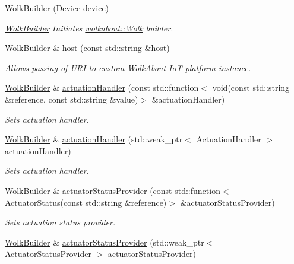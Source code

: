 \begin{DoxyCompactItemize}
\item 
\hyperlink{classwolkabout_1_1WolkBuilder_a4bd7227f1e389a34e18cc77030dd7d84}{Wolk\+Builder} (Device device)
\begin{DoxyCompactList}\small\item\em \hyperlink{classwolkabout_1_1WolkBuilder}{Wolk\+Builder} Initiates \hyperlink{classwolkabout_1_1Wolk}{wolkabout\+::\+Wolk} builder. \end{DoxyCompactList}\item 
\hyperlink{classwolkabout_1_1WolkBuilder}{Wolk\+Builder} \& \hyperlink{classwolkabout_1_1WolkBuilder_a208c0a0d397efd615863ec1ea4f38f71}{host} (const std\+::string \&host)
\begin{DoxyCompactList}\small\item\em Allows passing of U\+RI to custom Wolk\+About IoT platform instance. \end{DoxyCompactList}\item 
\hyperlink{classwolkabout_1_1WolkBuilder}{Wolk\+Builder} \& \hyperlink{classwolkabout_1_1WolkBuilder_a5c8799ad21b6bb0f0c866af3295a69b7}{actuation\+Handler} (const std\+::function$<$ void(const std\+::string \&reference, const std\+::string \&value)$>$ \&actuation\+Handler)
\begin{DoxyCompactList}\small\item\em Sets actuation handler. \end{DoxyCompactList}\item 
\hyperlink{classwolkabout_1_1WolkBuilder}{Wolk\+Builder} \& \hyperlink{classwolkabout_1_1WolkBuilder_a0680cbb1e0cd4c12841be304d9faa869}{actuation\+Handler} (std\+::weak\+\_\+ptr$<$ Actuation\+Handler $>$ actuation\+Handler)
\begin{DoxyCompactList}\small\item\em Sets actuation handler. \end{DoxyCompactList}\item 
\hyperlink{classwolkabout_1_1WolkBuilder}{Wolk\+Builder} \& \hyperlink{classwolkabout_1_1WolkBuilder_ad85a6b424fc553e0fd044b0e8f61d95d}{actuator\+Status\+Provider} (const std\+::function$<$ Actuator\+Status(const std\+::string \&reference)$>$ \&actuator\+Status\+Provider)
\begin{DoxyCompactList}\small\item\em Sets actuation status provider. \end{DoxyCompactList}\item 
\hyperlink{classwolkabout_1_1WolkBuilder}{Wolk\+Builder} \& \hyperlink{classwolkabout_1_1WolkBuilder_aa6884d08e743c7f2d0a173aa2a0cf529}{actuator\+Status\+Provider} (std\+::weak\+\_\+ptr$<$ Actuator\+Status\+Provider $>$ actuator\+Status\+Provider)

\end{DoxyCompactItemize}
